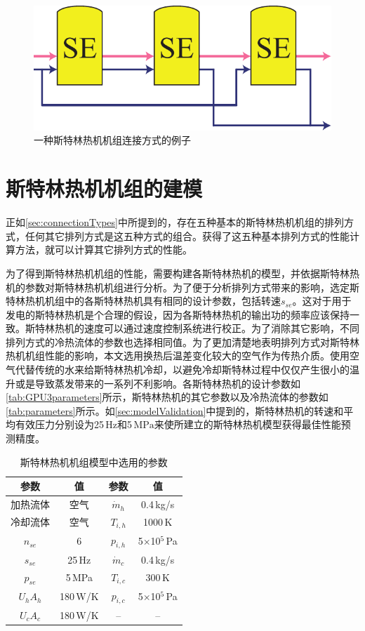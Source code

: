 \begin{figure}[htbp]
\centering
	\includegraphics[width = 0.3\columnwidth]{fig/SEA_eg}
	\caption{一种斯特林热机机组连接方式的例子}
	\label{fig:SEA_eg}
\end{figure}

\section{斯特林热机机组的建模}

正如\autoref{sec:connectionTypes}中所提到的，存在五种基本的斯特林热机机组的排列方式，任何其它排列方式是这五种方式的组合。获得了这五种基本排列方式的性能计算方法，就可以计算其它排列方式的性能。

为了得到斯特林热机机组的性能，需要构建各斯特林热机的模型，并依据斯特林热机的参数对斯特林热机机组进行分析。为了便于分析排列方式带来的影响，选定斯特林热机机组中的各斯特林热机具有相同的设计参数，包括转速$s_{se}$。这对于用于发电的斯特林热机是个合理的假设，因为各斯特林热机的输出功的频率应该保持一致。斯特林热机的速度可以通过速度控制系统进行校正\cite{Hooshang2016}。为了消除其它影响，不同排列方式的冷热流体的参数也选择相同值。为了更加清楚地表明排列方式对斯特林热机机组性能的影响，本文选用换热后温差变化较大的空气作为传热介质。使用空气代替传统的水来给斯特林热机冷却，以避免冷却斯特林过程中仅仅产生很小的温升或是导致蒸发带来的一系列不利影响。各斯特林热机的设计参数如\autoref{tab:GPU3parameters}所示，斯特林热机的其它参数以及冷热流体的参数如\autoref{tab:parameters}所示。如\autoref{sec:modelValidation}中提到的，斯特林热机的转速和平均有效压力分别设为25$\,\mathrm{Hz}$和5$\,\mathrm{MPa}$来使所建立的斯特林热机模型获得最佳性能预测精度。

\begin{table}[htbp]
	\caption{斯特林热机机组模型中选用的参数}
	\centering
	\begin{tabular}{cccc}
		\toprule
		参数		&	值	& 参数	&	值\\
		\midrule
		加热流体	&	空气		&	$\dot{m}_h$	&	0.4\,kg/s\\
		冷却流体	&	空气	&	$T_{i,h}$	&	1000\,K\\
		$n_{se}$	&	6	&	$p_{i,h}$	&	5$\times$10$^5$\,Pa\\
		$s_{se}$	&	25\,Hz	&	$\dot{m}_c$	&	0.4\,kg/s\\
		$p_{se}$		&	5\,MPa	&	$T_{i,c}$	&	300\,K\\
		$U_hA_h$	&	180\,W/K	&	$p_{i,c}$	&	5$\times$10$^5$\,Pa\\
		$U_cA_c$		&	180\,W/K	&--&--\\
		\bottomrule
	\end{tabular}
	\label{tab:parameters}
\end{table}

